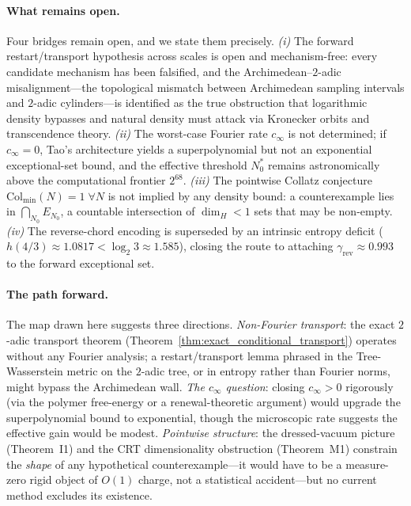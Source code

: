 \documentclass[12pt,a4paper]{article}
\begin{document}
\paragraph{What remains open.}
Four bridges remain open, and we state them precisely.
\emph{(i)} The forward restart/transport hypothesis across scales is open and
mechanism-free: every candidate mechanism has been falsified, and the
Archimedean--$2$-adic misalignment---the topological mismatch between
Archimedean sampling intervals and $2$-adic cylinders---is identified as the
true obstruction that logarithmic density bypasses and natural density must
attack via Kronecker orbits and transcendence theory.
\emph{(ii)} The worst-case Fourier rate $c_\infty$ is not determined; if
$c_\infty=0$, Tao's architecture yields a superpolynomial but not an
exponential exceptional-set bound, and the effective threshold $N_0^*$
remains astronomically above the computational frontier $2^{68}$.
\emph{(iii)} The pointwise Collatz conjecture
$\mathrm{Col}_{\min}(N)=1\;\forall N$ is not implied by any density bound:
a counterexample lies in $\bigcap_{N_0}E_{N_0}$, a countable intersection of
$\dim_H<1$ sets that may be non-empty.
\emph{(iv)} The reverse-chord encoding is superseded by an intrinsic entropy
deficit ($h(4/3)\approx1.0817<\log_2 3\approx1.585$), closing the route to
attaching $\gamma_{\mathrm{rev}}\approx0.993$ to the forward exceptional set.

\paragraph{The path forward.}
The map drawn here suggests three directions.
\emph{Non-Fourier transport}: the exact $2$-adic transport theorem
(Theorem~\ref{thm:exact_conditional_transport}) operates without any
Fourier analysis; a restart/transport lemma phrased in the Tree-Wasserstein
metric on the $2$-adic tree, or in entropy rather than Fourier norms,
might bypass the Archimedean wall.
\emph{The $c_\infty$ question}: closing $c_\infty>0$ rigorously (via the
polymer free-energy or a renewal-theoretic argument) would upgrade the
superpolynomial bound to exponential, though the microscopic rate suggests
the effective gain would be modest.
\emph{Pointwise structure}: the dressed-vacuum picture (Theorem~I1) and the
CRT dimensionality obstruction (Theorem~M1) constrain the \emph{shape} of any
hypothetical counterexample---it would have to be a measure-zero rigid object
of $O(1)$ charge, not a statistical accident---but no current method excludes
its existence.
\end{document}
